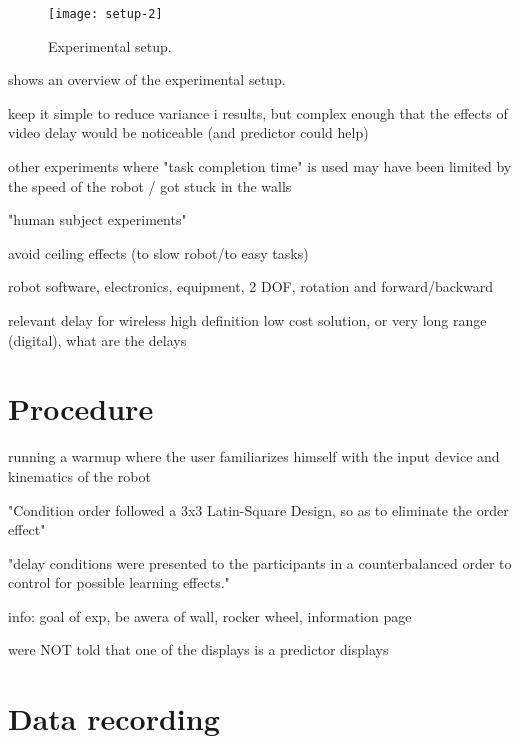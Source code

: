\begin{figure}[h!]
    \centering
    \texttt{[image: setup-2]}
    \caption{Experimental setup.}
    \label{expsetup}
\end{figure}

 shows an overview of the experimental setup.


keep it simple to reduce variance i results, but complex enough that the effects of video delay would be noticeable (and predictor could help)

other experiments where "task completion time" is used may have been limited by the speed of the robot / got stuck in the walls

"human subject experiments"

avoid ceiling effects (to slow robot/to easy tasks)

robot software, electronics, equipment, 2 DOF, rotation and forward/backward

relevant delay for wireless high definition low cost solution, or very long range (digital), what are the delays


\section{Procedure}

running a warmup where the user familiarizes himself with the input device and kinematics of the robot

\citep{Lu2018} "Condition order followed a 3x3 Latin-Square Design, so as to eliminate the order effect"

"delay conditions were presented to the participants in a counterbalanced order to control for possible learning effects."

info: goal of exp, be awera of wall, rocker wheel, information page

were NOT told that one of the displays is a predictor displays


\section{Data recording}

